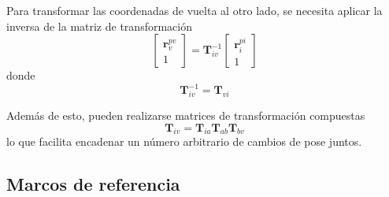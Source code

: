 Para transformar las coordenadas de vuelta al otro lado, se necesita aplicar la inversa de la matriz de transformación
\begin{equation}
    \begin{bmatrix}
        \bm{r}_v^{pv} \\
        1
    \end{bmatrix}
    =
    \bm{T}_{iv}^{-1}
    \begin{bmatrix}
        \bm{r}_i^{pi} \\
        1
    \end{bmatrix}
\end{equation}
donde
\begin{equation}
    \bm{T}_{iv}^{-1} = \bm{T}_{vi}
\end{equation}

Además de esto, pueden realizarse matrices de transformación compuestas
\begin{equation}
    \bm{T}_{iv} = \bm{T}_{ia}\bm{T}_{ab}\bm{T}_{bv}
\end{equation}
lo que facilita encadenar un número arbitrario de cambios de pose juntos.

\subsection{Marcos de referencia}

